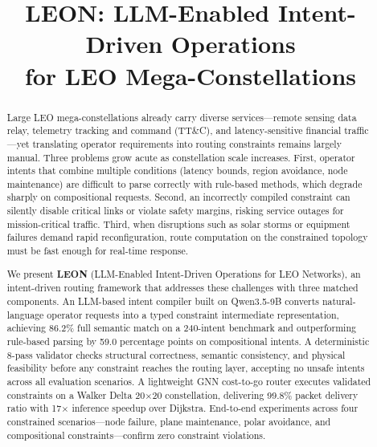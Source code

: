 \documentclass[10pt, conference, letterpaper]{IEEEtran}
\begin{document}
\title{LEON: LLM-Enabled Intent-Driven Operations\\for LEO Mega-Constellations}

\author{}

\maketitle

\begin{abstract}
Large LEO mega-constellations already carry diverse services---remote
sensing data relay, telemetry tracking and command (TT\&C), and
latency-sensitive financial traffic---yet translating operator
requirements into routing constraints remains largely manual.
Three problems grow acute as constellation scale increases.
First, operator intents that combine multiple conditions
(latency bounds, region avoidance, node maintenance) are difficult
to parse correctly with rule-based methods, which degrade sharply
on compositional requests.
Second, an incorrectly compiled constraint can silently disable
critical links or violate safety margins, risking service outages
for mission-critical traffic.
Third, when disruptions such as solar storms or equipment failures
demand rapid reconfiguration, route computation on the constrained
topology must be fast enough for real-time response.

We present \textbf{LEON} (LLM-Enabled Intent-Driven Operations for
LEO Networks), an intent-driven routing framework that addresses
these challenges with three matched components.
An LLM-based intent compiler built on Qwen3.5-9B converts
natural-language operator requests into a typed constraint
intermediate representation, achieving 86.2\% full semantic match
on a 240-intent benchmark and outperforming rule-based parsing
by 59.0 percentage points on compositional intents.
A deterministic 8-pass validator checks structural correctness,
semantic consistency, and physical feasibility before any constraint
reaches the routing layer, accepting no unsafe intents across all
evaluation scenarios.
A lightweight GNN cost-to-go router executes validated constraints
on a Walker Delta 20$\times$20 constellation, delivering 99.8\%
packet delivery ratio with 17$\times$ inference speedup over
Dijkstra.
End-to-end experiments across four constrained scenarios---node
failure, plane maintenance, polar avoidance, and compositional
constraints---confirm zero constraint violations.
\end{abstract}
\end{document}
